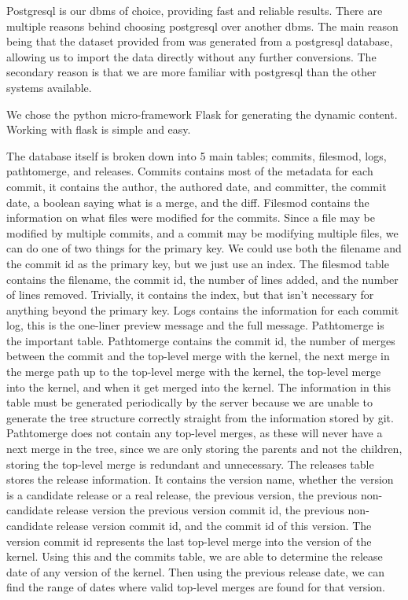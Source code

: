 \documentclass[conference, draftclsnofoot]{IEEEtran}
\begin{document}
Postgresql is our dbms of choice, providing fast and reliable results. There
are multiple reasons behind choosing postgresql over another dbms. The main
reason being that the dataset provided from  was generated from
a postgresql database, allowing us to import the data directly without any
further conversions. The secondary reason is that we are more familiar with
postgresql than the other systems available.

We chose the python micro-framework Flask for generating the dynamic content.
Working with flask is simple and easy.

The database itself is broken down into 5 main tables; commits, filesmod, logs,
pathtomerge, and releases. Commits contains most of the metadata for each
commit, it contains the author, the authored date, and committer, the commit
date, a boolean saying what is a merge, and the diff. Filesmod contains the
information on what files were modified for the commits. Since a file may be
modified by multiple commits, and a commit may be modifying multiple files, we
can do one of two things for the primary key. We could use both the filename
and the commit id as the primary key, but we just use an index. The filesmod
table contains the filename, the commit id, the number of lines added, and the
number of lines removed. Trivially, it contains the index, but that isn't
necessary for anything beyond the primary key. Logs contains the information
for each commit log, this is the one-liner preview message and the full
message. Pathtomerge is the important table. Pathtomerge contains the commit
id, the number of merges between the commit and the top-level merge with the
kernel, the next merge in the merge path up to the top-level merge with the
kernel, the top-level merge into the kernel, and when it get merged into the
kernel. The information in this table must be generated periodically by the
server because we are unable to generate the tree structure correctly straight
from the information stored by git. Pathtomerge does not contain any top-level
merges, as these will never have a next merge in the tree, since we are only
storing the parents and not the children, storing the top-level merge is
redundant and unnecessary. The releases table stores the release information.
It contains the version name, whether the version is a candidate release or a
real release, the previous version, the previous non-candidate release version
the previous version commit id, the previous non-candidate release version
commit id, and the commit id of this version. The version commit id represents
the last top-level merge into the version of the kernel. Using this and the
commits table, we are able to determine the release date of any version of the
kernel. Then using the previous release date, we can find the range of dates
where valid top-level merges are found for that version.
\end{document}
